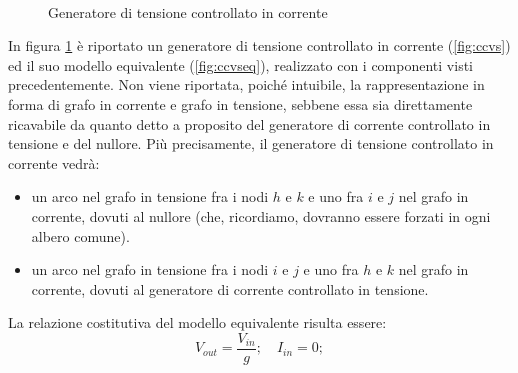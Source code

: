 \begin{figure}[b]
 \centering
 \\
 \caption{Generatore di tensione controllato in corrente}
 \label{fig:ccvscmp}
\end{figure}

In figura \ref{fig:ccvscmp} è riportato un generatore di tensione controllato in corrente (\ref{fig:ccvs}) ed il suo modello equivalente (\ref{fig:ccvseq}), realizzato con i componenti visti precedentemente. Non viene riportata, poiché intuibile, la rappresentazione in forma di grafo in corrente e grafo in tensione, sebbene essa sia direttamente ricavabile da quanto detto a proposito del generatore di corrente controllato in tensione e del nullore. Più precisamente, il generatore di tensione controllato in corrente vedrà:
\begin{itemize}
 \item un arco nel grafo in tensione fra i nodi $h$ e $k$ e uno fra $i$ e $j$ nel grafo in corrente, dovuti al nullore (che, ricordiamo, dovranno essere forzati in ogni albero comune).
 \item un arco nel grafo in tensione fra i nodi $i$ e $j$ e uno fra $h$ e $k$ nel grafo in corrente, dovuti al generatore di corrente controllato in tensione.
\end{itemize}
La relazione costitutiva del modello equivalente risulta essere:
$$ V_{out} = \frac{V_{in}}{g};\quad I_ {in} = 0; $$

